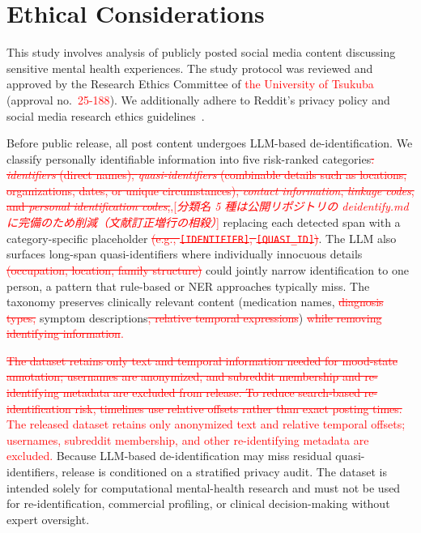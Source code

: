 \documentclass[runningheads]{llncs}
\newcommand{\rev}[1]{\textcolor{red}{#1}}
\newcommand{\del}[1]{\textcolor{red}{\sout{#1}}}
\newcommand{\dnote}[1]{\textcolor{red}{[\textit{#1}]}}
\newcommand{\rev}[1]{#1}
\newcommand{\del}[1]{}
\newcommand{\dnote}[1]{}
\begin{document}
\section{Ethical Considerations}
\label{sec:ethics}

This study involves analysis of publicly posted social media content discussing sensitive mental health experiences. The study protocol was reviewed and approved by the Research Ethics Committee of \rev{the University of Tsukuba} (approval no.~\rev{25-188}). We additionally adhere to Reddit's privacy policy and social media research ethics guidelines~\cite{harrigian2021state}.

Before public release, all post content undergoes LLM-based de-identification. We classify personally identifiable information into five risk-ranked categories\del{: \emph{identifiers} (direct names), \emph{quasi-identifiers} (combinable details such as locations, organizations, dates, or unique circumstances), \emph{contact information}, \emph{linkage codes}, and \emph{personal identification codes},}\rev{,}\dnote{分類名 5 種は公開リポジトリの deidentify.md に完備のため削減（文献訂正増行の相殺）} replacing each detected span with a category-specific placeholder\del{ (e.g., \texttt{[IDENTIFIER]}, \texttt{[QUASI\_ID]})}. The LLM also surfaces long-span quasi-identifiers where individually innocuous details\del{ (occupation, location, family structure)} could jointly narrow identification to one person, a pattern that rule-based or NER approaches typically miss. The taxonomy preserves clinically relevant content (medication names, \del{diagnosis types, }symptom descriptions\del{, relative temporal expressions})\del{ while removing identifying information}\rev{.}

\del{The dataset retains only text and temporal information needed for mood-state annotation; usernames are anonymized, and subreddit membership and re-identifying metadata are excluded from release. To reduce search-based re-identification risk, timelines use relative offsets rather than exact posting times.} \rev{The released dataset retains only anonymized text and relative temporal offsets; usernames, subreddit membership, and other re-identifying metadata are excluded.} Because LLM-based de-identification may miss residual quasi-identifiers, release is conditioned on a stratified privacy audit. The dataset is intended solely for computational mental-health research and must not be used for re-identification, commercial profiling, or clinical decision-making without expert oversight.
\end{document}
